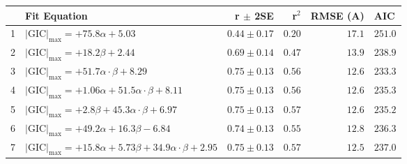\begin{tabular}{l l r r r}
 & Fit Equation & r $\pm$ 2SE & r$^2$ & RMSE (A) & AIC \\
 & $\vert{\text{GIC}\vert_\text{max}} = +75.8 \alpha  +5.03$ & $0.44 \pm 0.17$ & $0.20$ & $17.1$ & $251.0$ \\
2 & $\vert{\text{GIC}\vert_\text{max}} = +18.2 \beta  +2.44$ & $0.69 \pm 0.14$ & $0.47$ & $13.9$ & $238.9$ \\
3 & $\vert{\text{GIC}\vert_\text{max}} = +51.7 \alpha \cdot \beta  +8.29$ & $0.75 \pm 0.13$ & $0.56$ & $12.6$ & $233.3$ \\
4 & $\vert{\text{GIC}\vert_\text{max}} = +1.06 \alpha +51.5 \alpha \cdot \beta  +8.11$ & $0.75 \pm 0.13$ & $0.56$ & $12.6$ & $235.3$ \\
5 & $\vert{\text{GIC}\vert_\text{max}} = +2.8 \beta +45.3 \alpha \cdot \beta  +6.97$ & $0.75 \pm 0.13$ & $0.57$ & $12.6$ & $235.2$ \\
6 & $\vert{\text{GIC}\vert_\text{max}} = +49.2 \alpha +16.3 \beta  -6.84$ & $0.74 \pm 0.13$ & $0.55$ & $12.8$ & $236.3$ \\
7 & $\vert{\text{GIC}\vert_\text{max}} = +15.8 \alpha +5.73 \beta +34.9 \alpha \cdot \beta  +2.95$ & $0.75 \pm 0.13$ & $0.57$ & $12.5$ & $237.0$ \\
\end{tabular}
